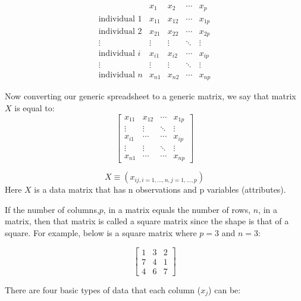 \documentclass[a4paper]{article}
\begin{document}
    $$\begin{matrix}
    & x_1 & x_2 & \cdots & x_p\\
    \text{individual } 1 & x_{11} & x_{12} & \cdots & x_{1p}\\
    \text{individual } 2 & x_{21} & x_{22} & \cdots & x_{2p}\\
    \vdots & \vdots & \vdots &\ddots & \vdots \\
    \text{individual } i & x_{i1} & x_{i2} & \cdots & x_{ip}\\
    \vdots & \vdots & \vdots & \ddots & \vdots \\
    \text{individual } n & x_{n1} & x_{n2} & \cdots & x_{np}
    \end{matrix}$$

Now converting our generic spreadsheet to a generic matrix, we say that matrix $X$ is equal to:
   $$\begin{bmatrix}
     x_{11} & x_{12} & \cdots & x_{1p}\\
    \vdots & \vdots & \ddots& \vdots \\
     x_{i1} & \cdots & \cdots & x_{ip}\\
    \vdots & \vdots & \ddots & \vdots \\
     x_{n1} & \cdots & \cdots & x_{np}
    \end{bmatrix}$$

    $$X\equiv (x_{ij, i=1,...,n, j=1,...,p})$$
  Here $X$ is a data matrix that has n observations and p variables (attributes).

If the number of columns,$p$, in a matrix equals the number of rows, $n$, in a matrix, then that matrix is called a square matrix since the shape is that of a square. For example, below is a square matrix where $p=3$ and $n=3$:

   $$\begin{bmatrix}
    1 & 3 & 2 \\
    7 & 4 & 1\\
    4 & 6 & 7
    \end{bmatrix}$$

  There are four basic types of data that each column ($x_{j}$) can be:
\end{document}
